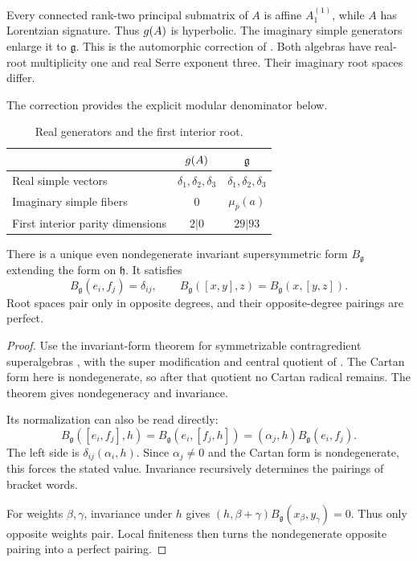 \begin{remark}
\label{rem:bkm-borcherds-correction}
\label{sec:bkm-rank-three-comparison}
Every connected rank-two principal submatrix of $A$ is affine
$A_1^{(1)}$, while $A$ has Lorentzian signature. Thus $g(A)$ is
hyperbolic. The imaginary simple generators enlarge it to
$\mathfrak g$. This is the automorphic correction of
\cite[Section~3]{GN}. Both algebras have real-root multiplicity one
and real Serre exponent three. Their imaginary root spaces differ.

The correction provides the explicit modular denominator below.
\begin{table}[ht]
\centering
\caption{Real generators and the first interior root.}
\label{tab:bkm-real-root-comparison}
\begin{tabular}{lcc}
 & $g(A)$ & $\mathfrak g$\\\hline
Real simple vectors & $\delta_1,\delta_2,\delta_3$ & $\delta_1,\delta_2,\delta_3$\\
Imaginary simple fibers & $0$ & $\mu_{\bar p}(a)$\\
First interior parity dimensions & $2|0$ & $29|93$
\end{tabular}
\end{table}
\end{remark}

\begin{lemma}
\label{lem:bkm-invariant-form}
There is a unique even nondegenerate invariant supersymmetric form
$B_{\mathfrak g}$ extending the form on $\mathfrak h$. It satisfies
\[
 B_{\mathfrak g}(e_i,f_j)=\delta_{ij},\qquad
 B_{\mathfrak g}([x,y],z)=B_{\mathfrak g}(x,[y,z]).
\]
Root spaces pair only in opposite degrees, and their opposite-degree
pairings are perfect.
\end{lemma}
\begin{proof}
Use the invariant-form theorem for symmetrizable contragredient
superalgebras \cite[Chapter~2]{KAC:1}, with the super modification
and central quotient of \cite[Section~6, Type~1 and~(6.28)]{GN}.
The Cartan form here is nondegenerate, so after that quotient no
Cartan radical remains. The theorem gives nondegeneracy and
invariance.

Its normalization can also be read directly:
\[
 B_{\mathfrak g}([e_i,f_j],h)
 =B_{\mathfrak g}(e_i,[f_j,h])
 =(\alpha_j,h)B_{\mathfrak g}(e_i,f_j).
\]
The left side is $\delta_{ij}(\alpha_i,h)$. Since $\alpha_j\ne0$
and the Cartan form is nondegenerate, this forces the stated value.
Invariance recursively determines the pairings of bracket words.

For weights $\beta,\gamma$, invariance under $h$ gives
$(h,\beta+\gamma)B_{\mathfrak g}(x_\beta,y_\gamma)=0$.
Thus only opposite weights pair. Local finiteness then turns the
nondegenerate opposite pairing into a perfect pairing.
\end{proof}

